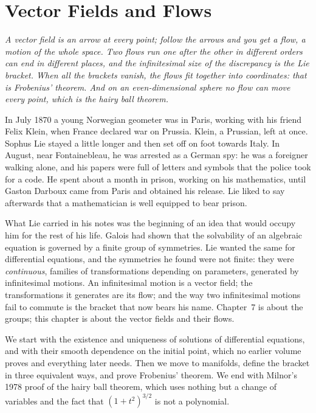\chapter{Vector Fields and Flows}

\begin{center}\itshape
A vector field is an arrow at every point; follow the arrows and you get a flow, a motion of the whole space. Two flows run one after the other in
different orders can end in different places, and the infinitesimal size of the discrepancy is the Lie bracket. When all the brackets vanish, the flows
fit together into coordinates: that is Frobenius' theorem. And on an even-dimensional sphere no flow can move every point, which is the hairy ball
theorem.
\end{center}

In July 1870 a young Norwegian geometer was in Paris, working with his friend Felix Klein, when France declared war on Prussia. Klein, a Prussian, left at
once. Sophus Lie stayed a little longer and then set off on foot towards Italy. In August, near Fontainebleau, he was arrested as a German spy: he was a
foreigner walking alone, and his papers were full of letters and symbols that the police took for a code. He spent about a month in prison, working on
his mathematics, until Gaston Darboux came from Paris and obtained his release. Lie liked to say afterwards that a mathematician is well equipped to
bear prison.

What Lie carried in his notes was the beginning of an idea that would occupy him for the rest of his life. Galois had shown that the solvability of an
algebraic equation is governed by a finite group of symmetries. Lie wanted the same for differential equations, and the symmetries he found were not
finite: they were \emph{continuous}, families of transformations depending on parameters, generated by infinitesimal motions. An infinitesimal motion
is a vector field; the transformations it generates are its flow; and the way two infinitesimal motions fail to commute is the bracket that now bears
his name. Chapter~7 is about the groups; this chapter is about the vector fields and their flows.

We start with the existence and uniqueness of solutions of differential equations, and with their smooth dependence on the initial point, which no
earlier volume proves and everything later needs. Then we move to manifolds, define the bracket in three equivalent ways, and prove Frobenius' theorem.
We end with Milnor's 1978 proof of the hairy ball theorem, which uses nothing but a change of variables and the fact that $(1+t^2)^{3/2}$ is not a
polynomial.

